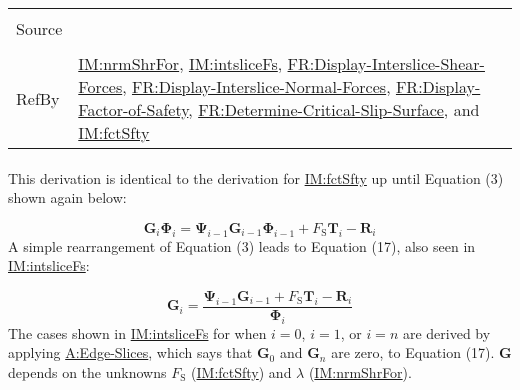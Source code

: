 \documentclass[12pt]{article}
\begin{document}
\begin{minipage}{\textwidth}
\begin{tabular}{>{\raggedright}p{}>{\raggedright\arraybackslash}p{}}
\\ \midrule \\
Source & \cite{chen2005}
         
\\ \midrule \\
RefBy & \hyperref[IM:nrmShrFor]{IM:nrmShrFor}, \hyperref[IM:intsliceFs]{IM:intsliceFs}, \hyperref[displayShear]{FR:Display-Interslice-Shear-Forces}, \hyperref[displayNormal]{FR:Display-Interslice-Normal-Forces}, \hyperref[displayFS]{FR:Display-Factor-of-Safety}, \hyperref[determineCritSlip]{FR:Determine-Critical-Slip-Surface}, and \hyperref[IM:fctSfty]{IM:fctSfty}
        
\\ \bottomrule
\end{tabular}
\end{minipage}
\paragraph{}
\label{IM:intsliceFsDeriv}
This derivation is identical to the derivation for \hyperref[IM:fctSfty]{IM:fctSfty} up until Equation (3) shown again below:

\begin{displaymath}
{\symbf{G}}_{i} {\symbf{Φ}}_{i}={\symbf{Ψ}}_{i-1} {\symbf{G}}_{i-1} {\symbf{Φ}}_{i-1}+{F_{\text{S}}} {\symbf{T}}_{i}-{\symbf{R}}_{i}
\end{displaymath}
A simple rearrangement of Equation (3) leads to Equation (17), also seen in \hyperref[IM:intsliceFs]{IM:intsliceFs}:

\begin{displaymath}
{\symbf{G}}_{i}=\frac{{\symbf{Ψ}}_{i-1} {\symbf{G}}_{i-1}+{F_{\text{S}}} {\symbf{T}}_{i}-{\symbf{R}}_{i}}{{\symbf{Φ}}_{i}}
\end{displaymath}
The cases shown in \hyperref[IM:intsliceFs]{IM:intsliceFs} for when $i=0$, $i=1$, or $i=n$ are derived by applying \hyperref[assumpES]{A:Edge-Slices}, which says that ${\symbf{G}}_{0}$ and ${\symbf{G}}_{n}$ are zero, to Equation (17). $\symbf{G}$ depends on the unknowns ${F_{\text{S}}}$ (\hyperref[IM:fctSfty]{IM:fctSfty}) and $λ$ (\hyperref[IM:nrmShrFor]{IM:nrmShrFor}).
\end{document}
